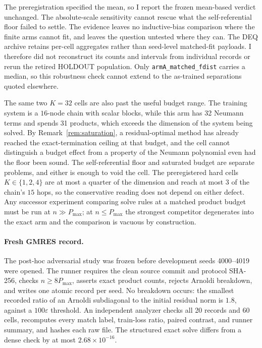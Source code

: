 The preregistration specified the mean, so I report the frozen mean-based
verdict unchanged. The absolute-scale sensitivity cannot rescue what the
self-referential floor failed to settle. The evidence leaves no inductive-bias
comparison where the finite arms cannot fit, and leaves the question untested
where they can.
The DEQ archive retains per-cell aggregates rather than seed-level matched-fit
payloads. I therefore did not reconstruct its counts and intervals from
individual records or rerun the retired HOLDOUT population. Only
\texttt{armA\_matched\_fdist} carries a median, so this robustness check cannot
extend to the as-trained separations quoted elsewhere.

The same two $K=32$ cells are also past the useful budget range. The training
system is a $16$-node chain with scalar blocks, while this arm has 32 Neumann terms and
spends 31 products, which exceeds the dimension of the system being solved.
By Remark~\ref{rem:saturation}, a residual-optimal method has already reached
the exact-termination ceiling at that budget, and the cell cannot distinguish
a budget effect from a property of the Neumann polynomial even had the floor
been sound. The self-referential floor and saturated budget are separate
problems, and either is enough to void the cell. The
preregistered hard cells $K\in\{1,2,4\}$ are at most a quarter of the dimension
and reach at most $3$ of the chain's $15$ hops, so the conservative reading does
not depend on either defect. Any successor experiment comparing solve rules at
a matched product budget must be run at $n\gg P_{\max}$; at $n\le P_{\max}$ the
strongest competitor degenerates into the exact arm and the comparison is
vacuous by construction.

\paragraph{Fresh GMRES record.}
The post-hoc adversarial study was frozen before development seeds 4000--4019
were opened. The runner requires the clean source commit and
protocol SHA-256, checks $n\geq8P_{\max}$, asserts exact product counts, rejects
Arnoldi breakdown, and writes one atomic record per seed. No breakdown occurs:
the smallest recorded ratio of an Arnoldi subdiagonal to the initial residual
norm is $1.8$, against a $100\varepsilon$ threshold. An independent
analyzer checks all 20 records and 60 cells, recomputes every match label,
train-loss ratio, paired contrast, and runner summary, and hashes each raw
file. The structured exact solve differs from a dense check by at most
$2.68\times10^{-16}$.

